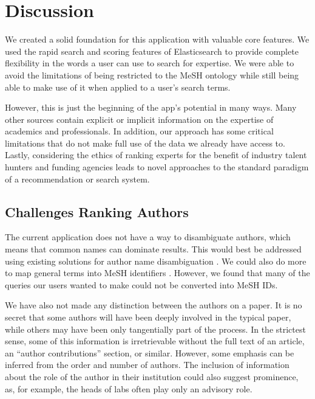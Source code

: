 \section{Discussion}

We created a solid foundation for this application with valuable core features. We used the rapid search and scoring features of Elasticsearch to provide complete flexibility in the words a user can use to search for expertise. We were able to avoid the limitations of being restricted to the MeSH ontology while still being able to make use of it when applied to a user's search terms.

However, this is just the beginning of the app's potential in many ways. Many other sources contain explicit or implicit information on the expertise of academics and professionals. In addition, our approach has some critical limitations that do not make full use of the data we already have access to. Lastly, considering the ethics of ranking experts for the benefit of industry talent hunters and funding agencies leads to novel approaches to the standard paradigm of a recommendation or search system. 

\subsection{Challenges Ranking Authors}

The current application does not have a way to disambiguate authors, which means that common names can dominate results. This would best be addressed using existing solutions for author name disambiguation \cite{ref-approach-author-name-disambiguation, ref-openalex}. We could also do more to map general terms into MeSH identifiers \cite{ref-approach-gilda}. However, we found that many of the queries our users wanted to make could not be converted into MeSH IDs. 

We have also not made any distinction between the authors on a paper. It is no secret that some authors will have been deeply involved in the typical paper, while others may have been only tangentially part of the process. In the strictest sense, some of this information is irretrievable without the full text of an article, an ``author contributions'' section, or similar. However, some emphasis can be inferred from the order and number of authors. The inclusion of information about the role of the author in their institution could also suggest prominence, as, for example, the heads of labs often play only an advisory role.

